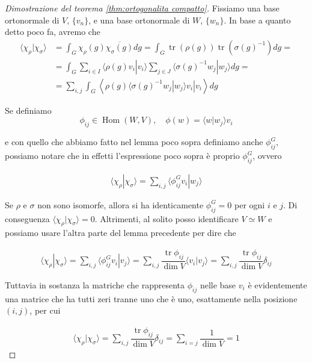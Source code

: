 \documentclass[11pt]{article}
\theoremstyle{plain}
\theoremstyle{definition}
\theoremstyle{remark}
\newcommand{\dsum}{\displaystyle\sum}
\newcommand{\dint}{\displaystyle\int}
\DeclareMathOperator{\tr}{tr}
\DeclareMathOperator{\Hom}{Hom}
\DeclareMathOperator{\iso}{\simeq}
\begin{document}
 \begin{proof}[Dimostrazione del teorema \ref{thm:ortogonalita compatto}]
 Fissiamo una base ortonormale di $V$, $\{v_n\}$, e una base ortonormale di $W$, $\{w_n\}$. In base a quanto detto poco fa, avremo che
 \begin{align*}
   \langle \chi_\rho | \chi_\sigma \rangle &= \dint_G \chi_\rho(g) \overline{\chi_\sigma(g)} dg = \dint_G \tr(\rho(g)) \tr(\sigma(g)^{-1}) dg = \\
   &= \dint_G \dsum_{i \in I} \langle \rho(g) v_i | v_i \rangle \dsum_{j \in J} \langle \sigma(g)^{-1} w_j | w_j \rangle dg = \\
   &= \dsum_{i,j} \dint_G \left\langle \rho(g) \langle \sigma(g)^{-1} w_j | w_j \rangle v_i | v_i \right\rangle dg
 \end{align*}

 Se definiamo
 \[ \phi_{ij} \in \Hom(W, V), \quad \phi(w) = \langle w | w_j \rangle v_i \]

 e con quello che abbiamo fatto nel lemma poco sopra definiamo anche $\phi^G_{ij}$, possiamo notare che in effetti l'espressione poco sopra è proprio $\phi^G_{ij}$, ovvero

 \begin{align*}
   \langle \chi_\rho | \chi_\sigma \rangle = \dsum_{i,j} \langle \phi_{ij}^G v_i | w_j \rangle
 \end{align*}

 Se $\rho$ e $\sigma$ non sono isomorfe, allora si ha identicamente $\phi_{ij}^G = 0$ per ogni $i$ e $j$. Di conseguenza $\langle \chi_\rho | \chi_\sigma \rangle = 0$. Altrimenti, al solito posso identificare $V \iso W$ e possiamo usare l'altra parte del lemma precedente per dire che

\begin{align*}
   \langle \chi_\rho | \chi_\sigma \rangle = \dsum_{i,j} \langle \phi_{ij}^G v_i | v_j \rangle = \dsum_{i,j} \dfrac{\tr \phi_{ij}}{\dim V} \langle v_i | v_j \rangle = \dsum_{i,j } \dfrac{\tr\phi_{ij}}{\dim V} \delta_{ij}
 \end{align*}

Tuttavia in sostanza la matriche che rappresenta $\phi_{ij}$ nelle base $v_i$ è evidentemente una matrice che ha tutti zeri tranne uno che è uno, esattamente nella posizione $(i,j)$, per cui


\begin{align*}
   \langle \chi_\rho | \chi_\sigma \rangle = \dsum_{i,j } \dfrac{\tr\phi_{ij}}{\dim V} \delta_{ij} = \dsum_{i=j} \dfrac{1}{\dim V} = 1
 \end{align*}

 \end{proof}
\end{document}
